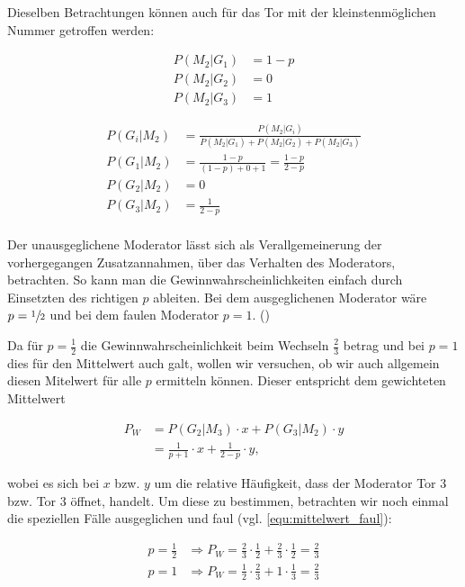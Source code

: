 Dieselben Betrachtungen können auch für das Tor mit der kleinstenmöglichen Nummer getroffen werden:

\begin{align*}
    P(M_2 | G_1) & = 1 - p \\
    P(M_2 | G_2) & = 0     \\
    P(M_2 | G_3) & = 1
\end{align*}

\begin{align*}
    P(G_i | M_2) & = \frac{P(M_2 | G_i)}{P(M_2 | G_1) + P(M_2 | G_2) + P(M_2 | G_3)} \\
    P(G_1 | M_2) & = \frac{1-p}{(1-p)+0+1} = \frac{1-p}{2-p}                         \\
    P(G_2 | M_2) & = 0                                                               \\
    P(G_3 | M_2) & = \frac{1}{2-p}                                                   \\
\end{align*}

Der unausgeglichene Moderator lässt sich als Verallgemeinerung der vorhergegangen Zusatzannahmen, über das Verhalten des Moderators, betrachten. So kann man die Gewinnwahrscheinlichkeiten einfach durch Einsetzten des richtigen $p$ ableiten.
Bei dem ausgeglichenen Moderator wäre $p = \sfrac{1}{2}$ und bei dem faulen Moderator $p = 1$.  (\cite{Rosenthal:2008})

Da für $p = \frac{1}{2}$ die Gewinnwahrscheinlichkeit beim Wechseln $\frac{2}{3}$ betrag und bei $p = 1$ dies für den Mittelwert auch galt, wollen wir versuchen, ob wir auch allgemein diesen Mitelwert für alle $p$ ermitteln können. Dieser entspricht dem gewichteten Mittelwert

\label{equ:mittelwert}
\begin{equation}
    \begin{split}
        P_W & = P(G_2 | M_3) \cdot x + P(G_3 | M_2) \cdot y    \\
        & = \frac{1}{p+1} \cdot x + \frac{1}{2-p} \cdot y,
    \end{split}
\end{equation}

wobei es sich bei $x$ bzw. $y$ um die relative Häufigkeit, dass der Moderator Tor 3 bzw. Tor 3 öffnet, handelt. Um diese zu bestimmen, betrachten wir noch einmal die speziellen Fälle ausgeglichen und faul (vgl. \autoref{equ:mittelwert_faul}):

\begin{align*}
    p = \frac{1}{2} & \Rightarrow  P_W = \frac{2}{3} \cdot \frac{1}{2} + \frac{2}{3} \cdot \frac{1}{2} = \frac{2}{3} \\
    p = 1           & \Rightarrow P_W = \frac{1}{2} \cdot \frac{2}{3} + 1\cdot \frac{1}{3} = \frac{2}{3}
\end{align*}

